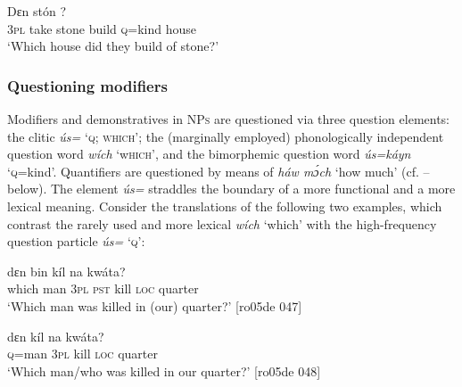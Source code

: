 \z


\ea%
    \label{ex:key:613}
    \gll Dɛn    stón         ?\\
\textsc{3pl}  take  stone  build  \textsc{q}=kind  house\\

\glt ‘Which house did they build of stone?’
\z

\subsubsection{Questioning modifiers}

Modifiers and demonstratives in \textsc{NPs} are questioned via three question elements: the clitic \textit{ús=} ‘\textsc{q}; \textsc{which’}; the (marginally employed) phonologically independent question word \textit{wích} ‘w\textsc{hich’,} and the bimorphemic question word \textit{ús=káyn} ‘\textsc{q}=kind’. Quantifiers are questioned by means of \textit{háw mɔ́ch} ‘how much’ (cf. – below). The element \textit{ús=} straddles the boundary of a more functional and a more lexical meaning. Consider the translations of the following two examples, which contrast the rarely used and more lexical \textit{wích} ‘which’ with the high-frequency question particle \textit{ús=} ‘\textsc{q’}:


\ea%
    \label{ex:key:614}
    \gll {}    dɛn  bin  kíl  na  kwáta?\\
which  man    \textsc{3pl}  \textsc{pst}  kill  \textsc{loc}  quarter\\

\glt ‘Which man was killed in (our) quarter?’ [ro05de 047]
\z


\ea%
    \label{ex:key:615}
    \gll {}  dɛn  kíl  na  kwáta?\\
\textsc{q}=man  \textsc{3pl}  kill  \textsc{loc}  quarter\\

\glt ‘Which man/who was killed in our quarter?’ [ro05de 048]
\z

